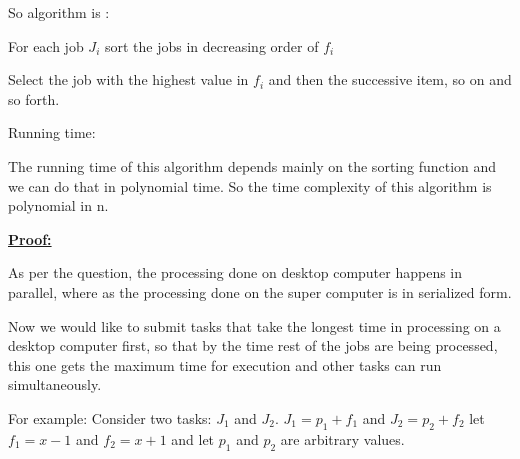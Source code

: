 \documentclass[letterpaper,portrait,12pt]{article}
\begin{document}
\begin{flushleft}
So algorithm is :
\end{flushleft}


\begin{flushleft}
	For each job $J_i$ sort the jobs in decreasing order of $f_i$
\end{flushleft}


\begin{flushleft}
	Select the job with the highest value in $f_i$ and then the successive item, so on and so forth.
\end{flushleft}


\begin{flushleft}
Running time:
\end{flushleft}


\begin{flushleft}
	The running time of this algorithm depends mainly on the sorting function and we can do that in polynomial time. So the time complexity of this algorithm is polynomial in n. 
\end{flushleft}


\begin{flushleft}

\end{flushleft}


\begin{flushleft}
\textbf{\uline{Proof:}}
\end{flushleft}


\begin{flushleft}
As per the question, the processing done on desktop computer happens in parallel, where as the processing done on the super computer is in serialized form.
\end{flushleft}


\begin{flushleft}

\end{flushleft}


\begin{flushleft}
Now we would like to submit tasks that take the longest time in processing on a desktop computer first, so that by the time rest of the jobs are being processed, this one gets the maximum time for execution and other tasks can run simultaneously.
\end{flushleft}


\begin{flushleft}
For example: Consider two tasks: $J_1$ and $J_2$. $J_1 = p_1 + f_1$ and $J_2 = p_2 + f_2$ let $f_1 = x-1 $ and $f_2 = x+1 $ and let $p_1 $ and $p_2$ are arbitrary values.
\end{flushleft}
\end{document}
